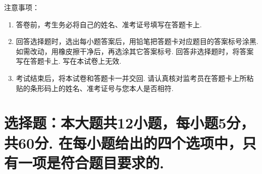 \documentclass[12pt,space]{ctexart} %
\begin{document}
\juemi%
\renewcommand{\filename}{文科数学试题}
{\heiti 注意事项}：
\begin{enumerate}[itemsep=-0.3em,topsep=0pt]
\item 答卷前，考生务必将自己的姓名、准考证号填写在答题卡上. 
\item 回答选择题时，选出每小题答案后，用铅笔把答题卡对应题目的答案标号涂黑. 如需改动，用橡皮擦干净后，再选涂其它答案标号. 回答非选择题时，将答案写在答题卡上. 写在本试卷上无效. 
\item 考试结束后，将本试卷和答题卡一并交回. 请认真核对监考员在答题卡上所粘贴的条形码上的姓名、准考证号与您本人是否相符. 
\end{enumerate}

\section{选择题：本大题共12小题，每小题5分，共60分. 在每小题给出的四个选项中，只有一项是符合题目要求的. }
\end{document}

